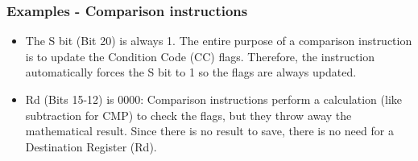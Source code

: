 \documentclass[../comorg-part1.tex]{subfiles}
\begin{document}
\subsubsection{Examples - Comparison instructions}
\begin{itemize}
    \item The S bit (Bit 20) is always 1. The entire purpose of a comparison instruction is to update the Condition Code (CC) flags. Therefore, the instruction automatically forces the S bit to 1 so the flags are always updated.
    \item Rd (Bits 15-12) is 0000: Comparison instructions perform a calculation (like subtraction for CMP) to check the flags, but they throw away the mathematical result.
    Since there is no result to save, there is no need for a Destination Register (Rd).
\end{itemize}
\end{document}
